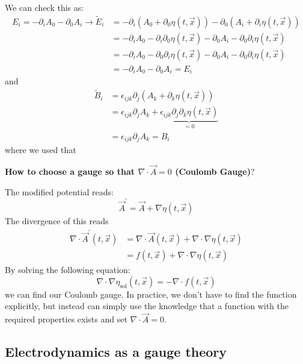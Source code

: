 We can check this as:
$$
\begin{aligned}
E_{i}=-\partial_{i} A_{0}-\partial_{0} A_{i} \rightarrow \tilde{E}_{i} &=-\partial_{i}\left(A_{0}+\partial_{0} \eta(t, \vec{x})\right)-\partial_{0}\left(A_{i}+\partial_{i} \eta(t, \vec{x})\right) \\
&=-\partial_{i} A_{0}-\partial_{i} \partial_{0} \eta(t, \vec{x})-\partial_{0} A_{i}-\partial_{0} \partial_{i} \eta(t, \vec{x}) \\
&=-\partial_{i} A_{0}-\partial_{0} \partial_{i} \eta(t, \vec{x})-\partial_{0} A_{i}-\partial_{0} \partial_{i} \eta(t, \vec{x}) \\
&=-\partial_{i} A_{0}-\partial_{0} A_{i}=E_i
\end{aligned}
$$
and
$$
\begin{aligned}
\tilde{B}_{i} &=\epsilon_{i j k} \partial_{j}\left(A_{k}+\partial_{k} \eta(t, \vec{x})\right) \\
&=\epsilon_{i j k} \partial_{j} A_{k}+\underbrace{\epsilon_{i j k} \partial_{j} \partial_{k} \eta(t, \vec{x})}_{=0} \\
&=\epsilon_{i j k} \partial_{j} A_{k}=B_i
\end{aligned}
$$
where we used that 
\begin{mybox}
\textbf{How to choose a gauge so that $\nabla \cdot \vec{A}=0$ (Coulomb Gauge)}?
\end{mybox}
\begin{mybox2}
The modified potential reads:
$$
\vec{A}^{\prime}=\vec{A}+\nabla \eta(t, \vec{x})
$$
The divergence of this reads
$$
\begin{aligned}
\nabla \cdot \vec{A}^{\prime}(t, \vec{x}) &=\nabla \cdot \vec{A}(t, \vec{x})+\nabla \cdot \nabla \eta(t, \vec{x}) \\
&=f(t, \vec{x})+\nabla \cdot \nabla \eta(t, \vec{x})
\end{aligned}
$$
By solving the following equation:
$$
\nabla \cdot \nabla \eta_{\mathrm{sol}}(t, \vec{x})=-\nabla \cdot f(t, \vec{x})
$$
we can find our Coulomb gauge. In practice, we don't have to find the function explicitly, but instead can simply use the knowledge that a function with the required properties exists and set $\nabla \cdot \vec{A}=0$.
\end{mybox2}

\subsection{Electrodynamics as a gauge theory}
